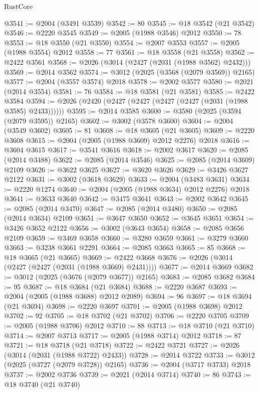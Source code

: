 \begin{lexlean}{RustCore}
\begin{coremodule}
@3541 := @2004 (@3491 @3539)
@3542 := 80
@3545 := @18 @3542 (@21 @3542)
@3546 := @2220 @3545
@3549 := @2005 (@1988 @3546) @2012
@3550 := 78
@3553 := @18 @3550 (@21 @3550)
@3554 := @2007 @3553
@3557 := @2005 (@1988 @3554) @2012
@3558 := 77
@3561 := @18 @3558 (@21 @3558)
@3562 := @2422 @3561
@3568 := @2026 (@3014 (@2427 (@2031 (@1988 @3562) @2432)))
@3569 := @2014 @3562
@3574 := @3012 (@2025 (@3568 (@2079 @3569)) @2165)
@3577 := @2004 (@3557 @3574) @2018
@3578 := @2002 @3577
@3580 := @2021 (@2014 @3554)
@3581 := 76
@3584 := @18 @3581 (@21 @3581)
@3585 := @2422 @3584
@3594 := @2026 (@2420 (@2427 (@2427 (@2427 (@2427 (@2031 (@1988 @3585) @2433))))))
@3595 := @2014 @3585
@3600 := @3580 (@2025 (@3594 (@2079 @3595)) @2165)
@3602 := @3002 (@3578 @3600)
@3604 := @2004 (@3549 @3602)
@3605 := 81
@3608 := @18 @3605 (@21 @3605)
@3609 := @2220 @3608
@3615 := @2004 (@2005 (@1988 @3609) @2012 @2276) @2018
@3616 := @3604 @3615
@3617 := @3541 @3616
@3618 := @2002 @3617
@3620 := @2085 (@2014 @3488)
@3622 := @2085 (@2014 @3546)
@3625 := @2085 (@2014 @3609) @2109
@3626 := @3622 @3625
@3627 := @3620 @3626
@3629 := @3426 @3627 @2122
@3631 := @3002 (@3618 @3629)
@3633 := @2004 (@3483 @3631)
@3634 := @2220 @1274
@3640 := @2004 (@2005 (@1988 @3634) @2012 @2276) @2018
@3641 := @3633 @3640
@3642 := @3475 @3641
@3643 := @2002 @3642
@3645 := @2085 (@2014 @3470)
@3647 := @2085 (@2014 @3480)
@3650 := @2085 (@2014 @3634) @2109
@3651 := @3647 @3650
@3652 := @3645 @3651
@3654 := @3426 @3652 @2122
@3656 := @3002 (@3643 @3654)
@3658 := @2085 @3656 @2109
@3659 := @3469 @3658
@3660 := @3280 @3659
@3661 := @3279 @3660
@3663 := @3238 @3661 @2291
@3664 := @2085 @3663
@3665 := 85
@3668 := @18 @3665 (@21 @3665)
@3669 := @2422 @3668
@3676 := @2026 (@3014 (@2427 (@2427 (@2031 (@1988 @3669) @2431))))
@3677 := @2014 @3669
@3682 := @3012 (@2025 (@3676 (@2079 @3677)) @2165)
@3683 := @2085 @3682
@3684 := 95
@3687 := @18 @3684 (@21 @3684)
@3688 := @2220 @3687
@3693 := @2004 (@2005 (@1988 @3688) @2012 @2089)
@3694 := 96
@3697 := @18 @3694 (@21 @3694)
@3698 := @2220 @3697
@3701 := @2005 (@1988 @3698) @2012
@3702 := 92
@3705 := @18 @3702 (@21 @3702)
@3706 := @2220 @3705
@3709 := @2005 (@1988 @3706) @2012
@3710 := 88
@3713 := @18 @3710 (@21 @3710)
@3714 := @2007 @3713
@3717 := @2005 (@1988 @3714) @2012
@3718 := 87
@3721 := @18 @3718 (@21 @3718)
@3722 := @2422 @3721
@3727 := @2026 (@3014 (@2031 (@1988 @3722) @2433))
@3728 := @2014 @3722
@3733 := @3012 (@2025 (@3727 (@2079 @3728)) @2165)
@3736 := @2004 (@3717 @3733) @2018
@3737 := @2002 @3736
@3739 := @2021 (@2014 @3714)
@3740 := 86
@3743 := @18 @3740 (@21 @3740)

\end{coremodule}
\end{lexlean}
